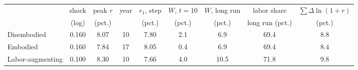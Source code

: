 \begin{tabular}{lcccccccc}\toprule
 & shock & peak $r$ & year & $r_1$, step & $W$, $t{=}10$ & $W$, long run & labor share & $\sum\Delta\ln(1+r)$\\
 & (log) & (pct.) & & (pct.) & (pct.) & (pct.) & long run (pct.) & (pct.)\\\midrule
Disembodied & 0.160 & 8.07 & 10 & 7.80 & 2.1 & 6.9 & 69.4 & 8.8\\
Embodied & 0.160 & 7.84 & 17 & 8.05 & 0.4 & 6.9 & 69.4 & 8.4\\
Labor-augmenting & 0.100 & 8.30 & 10 & 7.66 & 4.0 & 10.5 & 71.8 & 9.8\\
\bottomrule\end{tabular}
